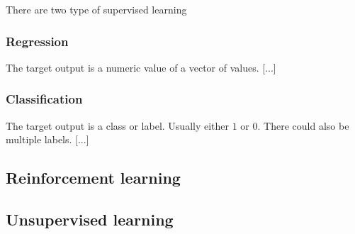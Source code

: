 \documentclass{article}
\begin{document}
There are two type of supervised learning

\subsubsection{Regression}
The target output is a numeric value of a vector of values. 
[...]

\subsubsection{Classification}
The target output is a class or label. Usually either \(1\) or \(0\).
There could also be multiple labels.
[...]

\subsection{Reinforcement learning}
\subsection{Unsupervised learning}
\end{document}
